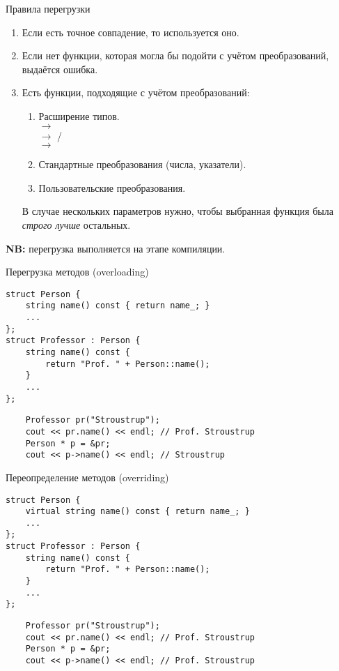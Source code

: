 \documentclass{beamer}
\begin{document}
\begin{frame}[fragile]{Правила перегрузки}
    \begin{enumerate}
        \item Если есть точное совпадение, то используется оно.

        \item Если нет функции, которая могла бы подойти с учётом преобразований,
            выдаётся ошибка.

        \item Есть функции, подходящие с учётом преобразований:

            \begin{enumerate}
                \item Расширение типов.\\
                     $\to$ \\
                     $\to$ /\\
                     $\to$ 

                \item Стандартные преобразования (числа, указатели).
                \item Пользовательские преобразования.
            \end{enumerate}
            В случае нескольких параметров нужно, чтобы выбранная функция была
            {\em строго лучше} остальных.
    \end{enumerate}
    {\bf NB:} перегрузка выполняется на этапе компиляции.
\end{frame}

\begin{frame}[fragile]{Перегрузка методов (overloading)}
    \begin{lstlisting}
struct Person {
    string name() const { return name_; }
    ...
};
struct Professor : Person {
    string name() const { 
        return "Prof. " + Person::name();
    }
    ...
};
    \end{lstlisting}

\begin{lstlisting}
    Professor pr("Stroustrup");
    cout << pr.name() << endl; // Prof. Stroustrup
    Person * p = &pr;
    cout << p->name() << endl; // Stroustrup 
\end{lstlisting}
\end{frame}

\begin{frame}[fragile]{Переопределение методов (overriding)}
    \begin{lstlisting}
struct Person {
    virtual string name() const { return name_; }
    ...
};
struct Professor : Person {
    string name() const { 
        return "Prof. " + Person::name();
    }
    ...
};
    \end{lstlisting}

\begin{lstlisting}
    Professor pr("Stroustrup");
    cout << pr.name() << endl; // Prof. Stroustrup
    Person * p = &pr;
    cout << p->name() << endl; // Prof. Stroustrup 
\end{lstlisting}
\end{frame}
\end{document}
